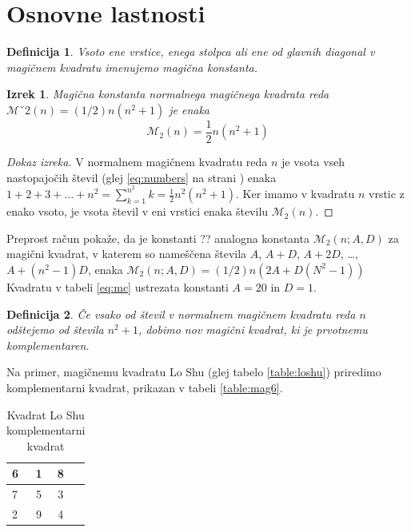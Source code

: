 \documentclass[a4paper,12pt]{article}
\newtheorem{definicija}{Definicija}
\newtheorem{izrek}{Izrek}
\newcommand{\m}{M_2}
\newcommand{\pojem}[1]{\emph{\color{purple}#1}}
\newenvironment{dokaz}{\begin{proof}[Dokaz izreka]}{\end{proof}}
\begin{document}
\section{Osnovne lastnosti}

\begin{definicija}
      Vsoto ene vrstice, enega stolpca ali ene od glavnih diagonal
      v magičnem kvadratu imenujemo \pojem{magična konstanta}.
 \end{definicija}

\begin{izrek}
   Magična konstanta normalnega magičnega kvadrata reda $\mathcal{M}ˇ2(n)=(1/2)n(n^2 + 1)$
   je enaka
   \begin{equation}
      \mathcal {M}_2 (n) = \frac{1}{2} n(n^2+1)
      \label{eq:mc}
   \end{equation}
\end{izrek}

\begin{dokaz}
   V normalnem magičnem kvadratu reda $n$ je vsota vseh nastopajočih
   števil (glej \eqref{eq:numbers} na strani \pageref{eq:numbers}) enaka
   $1+2+3+\dots+n^2=\sum_{k=1}^{n^2}k=\frac{1}{2}n^2(n^2+1)$. Ker imamo
   v kvadratu $n$ vrstic z enako vsoto, je vsota števil v eni vrstici
   enaka številu $\mathcal \m (n)$. %
   
\end{dokaz}

Preprost račun pokaže, da je konstanti ?? analogna konstanta
$\mathcal \m (n;A,D)$ za magični kvadrat, v katerem so nameščena števila
$A$, $A+D$, $A+2D$, \dots, $A+(n^2-1)D$, enaka %
$\mathcal \m (n;A,D)=(1/2)n(2A+ D(N^2- 1))$
Kvadratu v tabeli \eqref{eq:mc} ustrezata konstanti $A=20$ in $D=1$.

 \begin{definicija}
      Če vsako od števil v normalnem magičnem kvadratu reda $n$ odštejemo
      od števila $n^2+1$, dobimo nov magični kvadrat, ki je prvotnemu
      \pojem{komplementaren}.
 \end{definicija}

Na primer, magičnemu kvadratu Lo Shu (glej tabelo \ref{table:loshu}) priredimo
komplementarni kvadrat, prikazan v tabeli \ref{table:mag6}.
%

\begin{table}[htp]
   \centering
   \normalsize
   \caption{Kvadrat Lo Shu komplementarni kvadrat}
   \label{ttable:closhu}
   
   \begin{tabular}{|l|c|c|c|}
      \hline
        6 & 1 & 8 \\\hline
        7 & 5 & 3 \\\hline
        2 & 9 & 4 \\\hline
      
   \end{tabular}
\end{table}
\end{document}
